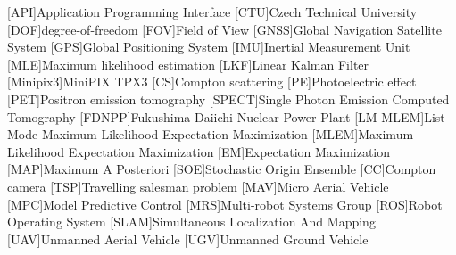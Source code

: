 
\begin{acronym}
  [API]{Application Programming Interface}
  [CTU]{Czech Technical University}
  [DOF]{degree-of-freedom}
  [FOV]{Field of View}
  [GNSS]{Global Navigation Satellite System}
  [GPS]{Global Positioning System}
  [IMU]{Inertial Measurement Unit}
  [MLE]{Maximum likelihood estimation}  
  [LKF]{Linear Kalman Filter}
  [Minipix3]{MiniPIX TPX3}
  [CS]{Compton scattering}
  [PE]{Photoelectric effect}
  [PET]{Positron emission tomography}
  [SPECT]{Single Photon Emission Computed Tomography}
  [FDNPP]{Fukushima Daiichi Nuclear Power Plant}
  [LM-MLEM]{List-Mode Maximum Likelihood Expectation Maximization}
  [MLEM]{Maximum Likelihood Expectation Maximization}
  [EM]{Expectation Maximization}
  [MAP]{Maximum A Posteriori}
  [SOE]{Stochastic Origin Ensemble}
  [CC]{Compton camera}
  [TSP]{Travelling salesman problem}
  [MAV]{Micro Aerial Vehicle}
  [MPC]{Model Predictive Control}
  [MRS]{Multi-robot Systems Group}
  [ROS]{Robot Operating System}
  [SLAM]{Simultaneous Localization And Mapping}
  [UAV]{Unmanned Aerial Vehicle}
  [UGV]{Unmanned Ground Vehicle}
\end{acronym}
